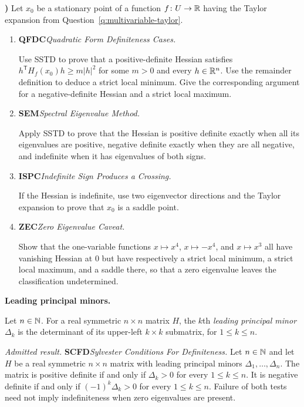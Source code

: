 \documentclass[10pt,a4paper]{article}
\newcounter{examquestion}
\newcommand{\examquestion}[1]{%
  \Needspace{5\baselineskip}%
  \refstepcounter{examquestion}%
  \par\addvspace{0.8\baselineskip}%
  \noindent\textbf{\theexamquestion)}\enspace #1\par
}
\newenvironment{subquestions}
  {\begin{enumerate}[label=\alph*),leftmargin=2.1em]}
  {\end{enumerate}}
\newcommand{\nameditem}[2]{%
  \textbf{\textsf{#1}}\enspace\emph{#2.}\enspace
}
\newcommand{\admitted}[3]{%
  \par\smallskip\noindent\emph{Admitted result.}\enspace
  \nameditem{#1}{#2}#3\par
}
\newcommand{\concept}[1]{%
  \par\addvspace{0.55\baselineskip}\noindent\textbf{#1.}\enspace
}
\begin{document}
\examquestion{\label{q:hessian-classification}
Let $x_0$ be a stationary point of a function
$f\colon U\to\mathbb{R}$ having the Taylor expansion from
Question~\ref{q:multivariable-taylor}.
\begin{subquestions}
  \item \nameditem{QFDC}{Quadratic Form Definiteness Cases}
  Use SSTD to prove that a positive-definite Hessian satisfies
  $h^{\mathsf T}H_f(x_0)h\geq m|h|^2$ for some $m>0$ and every
  $h\in\mathbb{R}^n$.  Use the remainder definition to deduce a strict local
  minimum.  Give the corresponding argument for a negative-definite Hessian
  and a strict local maximum.

  \item \nameditem{SEM}{Spectral Eigenvalue Method}
  Apply SSTD to prove that the Hessian is positive definite exactly when all
  its eigenvalues are positive, negative definite exactly when they are all
  negative, and indefinite when it has eigenvalues of both signs.

  \item \nameditem{ISPC}{Indefinite Sign Produces a Crossing}
  If the Hessian is indefinite, use two eigenvector directions and the
  Taylor expansion to prove that $x_0$ is a saddle point.

  \item \nameditem{ZEC}{Zero Eigenvalue Caveat}
  Show that the one-variable functions $x\mapsto x^4$, $x\mapsto-x^4$, and
  $x\mapsto x^3$ all have vanishing Hessian at $0$ but have respectively a
  strict local minimum, a strict local maximum, and a saddle there, so that
  a zero eigenvalue leaves the classification undetermined.
\end{subquestions}}

\concept{Leading principal minors}
Let $n\in\mathbb{N}$.  For a real symmetric $n\times n$ matrix $H$, the $k$th
\emph{leading principal minor} $\Delta_k$ is the determinant of its upper-left
$k\times k$ submatrix, for $1\leq k\leq n$.

\admitted{SCFD}{Sylvester Conditions For Definiteness}{Let $n\in\mathbb{N}$ and let
$H$ be a real symmetric $n\times n$ matrix with leading principal minors
$\Delta_1,\ldots,\Delta_n$.  The matrix is positive definite if and only if
$\Delta_k>0$ for every $1\leq k\leq n$.  It is negative definite if and
only if $(-1)^k\Delta_k>0$ for every $1\leq k\leq n$.  Failure of both
tests need not imply indefiniteness when zero eigenvalues are present.}
\end{document}
